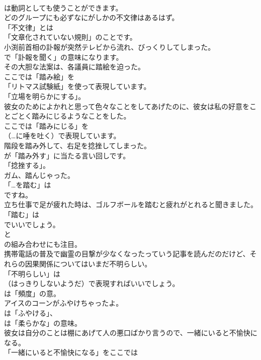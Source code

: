 \documentclass[8pt]{extreport}
\begin{document}
\begin{CJK}{UTF8}{min}
\\	は動詞としても使うことができます。	
\\	どのグループにも必ずなにがしかの不文律はあるはず。 
\\	「不文律」とは
\\	「文章化されていない規則」のことです。	
\\	小渕前首相の訃報が突然テレビから流れ、びっくりしてしまった。 
\\	で「訃報を聞く」の意味になります。	
\\	その大胆な法案は、各議員に踏絵を迫った。 
\\	ここでは「踏み絵」を
\\	「リトマス試験紙」を使って表現しています。
\\	「立場を明らかにする」。	
\\	彼女のためによかれと思って色々なことをしてあげたのに、彼女は私の好意をことごとく踏みにじるようなことをした。 
\\	ここでは「踏みにじる」を 
\\	（…に唾を吐く）で表現しています。	
\\	階段を踏み外して、右足を捻挫してしまった。 
\\	が「踏み外す」に当たる言い回しです。
\\	「捻挫する」。	
\\	ガム、踏んじゃった。 
\\	「…を踏む」は
\\	ですね。	
\\	立ち仕事で足が疲れた時は、ゴルフボールを踏むと疲れがとれると聞きました。 
\\	「踏む」は 
\\	でいいでしょう。
\\	と 
\\	の組み合わせにも注目。	
\\	携帯電話の普及で幽霊の目撃が少なくなったっていう記事を読んだのだけど、それらの因果関係についてはいまだ不明らしい。 
\\	「不明らしい」は 
\\	（はっきりしないようだ）で表現すればいいでしょう。
\\	は「頻度」の意。	
\\	アイスのコーンがふやけちゃったよ。 
\\	は「ふやける」、
\\	は「柔らかな」の意味。	
\\	彼女は自分のことは棚にあげて人の悪口ばかり言うので、一緒にいると不愉快になる。 
\\	「一緒にいると不愉快になる」をここでは 

\end{CJK}
\end{document}
